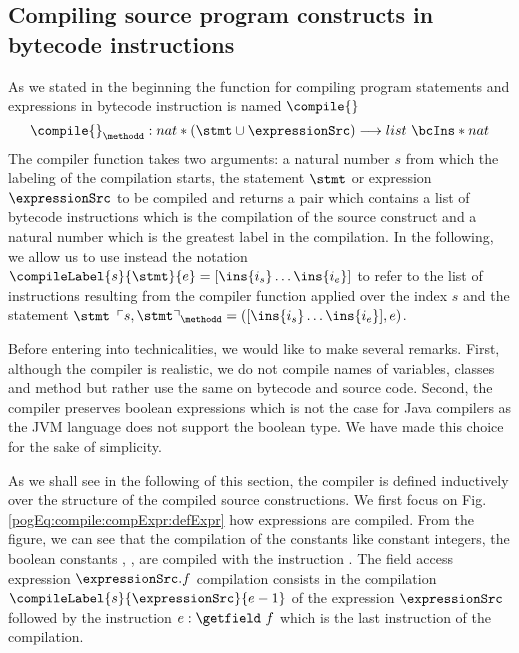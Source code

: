 

\subsection{Compiling source program  constructs in bytecode instructions} \label{pogEq:compile:compExpr} 

As we stated in the beginning the function for compiling program statements and expressions in bytecode instruction is named $\compile{}$
$$ \compile{ }_{\methodd} : nat * (\stmt \cup \expressionSrc ) \longrightarrow  list \ \bcIns * nat  $$
The compiler function takes two arguments: a natural number $s$ from which the labeling of the compilation starts,
 the statement $\stmt$ or expression $\expressionSrc$  to be compiled and
returns a pair which contains a list of bytecode instructions which is the compilation of the source construct
 and  a natural number which is the greatest label in the compilation. In the following, we allow us
to use instead the notation 
$ \compileLabel{s}{\stmt}{e} =[\ins{i_s} \ldots \ins{i_e} ] $
to refer to the list of instructions resulting from the compiler function applied
 over the index $s$ and the statement $\stmt$ 
$\ulcorner  s, \stmt  \urcorner_{\methodd} = ( [\ins{i_s} \ldots \ins{i_e}], e) $.

Before entering into technicalities, we would like to make several remarks. First, although the compiler is realistic,
we do not compile names of variables, classes and method but rather use the same on bytecode and source code. Second,
 the compiler preserves boolean expressions which is not the case for Java compilers as the JVM language does not support
the boolean type. We have made this choice for the sake of simplicity.    
 
As we shall see in the following of this section, the compiler is defined inductively over the structure 
of the compiled source constructions. We first focus on Fig. \ref{pogEq:compile:compExpr:defExpr} how expressions
 are compiled. From the figure, we can see that the compilation of
 the constants like constant integers, the boolean constants
\Mytrue, \Myfalse, \Mynull{}  are compiled with the instruction \push. The field access expression $ \expressionSrc.f$ compilation consists in the compilation
$\compileLabel{s}{\expressionSrc}{e - 1}$ of the expression   $ \expressionSrc $ followed by the instruction $ e: \getfield  \ f $ which is
 the last instruction of the compilation.  


